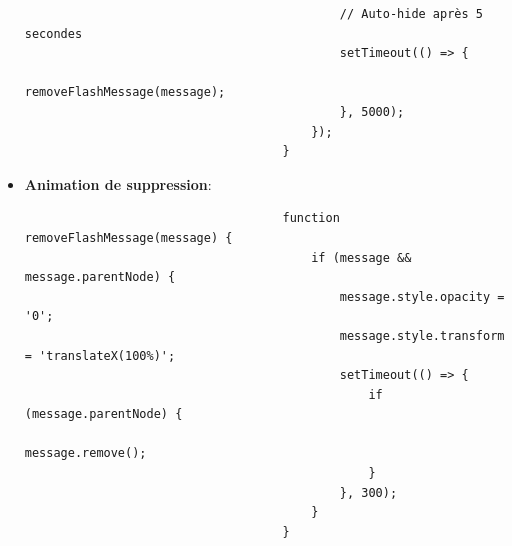 \documentclass[a4paper,11pt]{article}
\begin{document}
\begin{itemize}
\begin{tcolorbox}[colback=lightgray!5, colframe=gray!80, left=-70mm, right=5mm, top=2mm, bottom=0mm, boxrule=0.1mm]
\begin{verbatim}
                                            // Auto-hide après 5 secondes
                                            setTimeout(() => {
                                                removeFlashMessage(message);
                                            }, 5000);
                                        });
                                    }
                                \end{verbatim}
                            \end{tcolorbox}

                        \item \textbf{Animation de suppression}:
                            \begin{tcolorbox}[colback=lightgray!5, colframe=gray!80, left=-70mm, right=5mm, top=2mm, bottom=0mm, boxrule=0.1mm]
                                \begin{verbatim}
                                    function removeFlashMessage(message) {
                                        if (message && message.parentNode) {
                                            message.style.opacity = '0';
                                            message.style.transform = 'translateX(100%)';
                                            setTimeout(() => {
                                                if (message.parentNode) {
                                                    message.remove();
                                                }
                                            }, 300);
                                        }
                                    }
                                \end{verbatim}
                            \end{tcolorbox}


\end{itemize}
\end{document}

